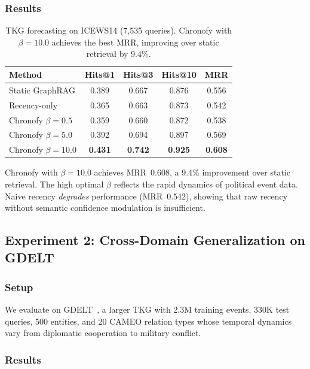 \documentclass[conference]{IEEEtran}
\begin{document}
\subsubsection{Results}

\begin{table}[t]
\centering
\caption{TKG forecasting on ICEWS14 (7,535 queries). Chronofy with $\beta=10.0$ achieves the best MRR, improving over static retrieval by 9.4\%.}
\label{tab:icews14}
\begin{tabular}{@{}lcccc@{}}
\toprule
\textbf{Method} & \textbf{Hits@1} & \textbf{Hits@3} & \textbf{Hits@10} & \textbf{MRR} \\
\midrule
Static GraphRAG & 0.389 & 0.667 & 0.876 & 0.556 \\
Recency-only & 0.365 & 0.663 & 0.873 & 0.542 \\
Chronofy $\beta{=}0.5$ & 0.359 & 0.660 & 0.872 & 0.538 \\
Chronofy $\beta{=}5.0$ & 0.392 & 0.694 & 0.897 & 0.569 \\
Chronofy $\beta{=}10.0$ & \textbf{0.431} & \textbf{0.742} & \textbf{0.925} & \textbf{0.608} \\
\bottomrule
\end{tabular}
\end{table}

Chronofy with $\beta=10.0$ achieves MRR~0.608, a 9.4\% improvement over static retrieval. The high optimal $\beta$ reflects the rapid dynamics of political event data. Naive recency \emph{degrades} performance (MRR~0.542), showing that raw recency without semantic confidence modulation is insufficient.

\subsection{Experiment 2: Cross-Domain Generalization on GDELT}

\subsubsection{Setup}
We evaluate on GDELT~\cite{garcia2018icews}, a larger TKG with 2.3M training events, 330K test queries, 500 entities, and 20 CAMEO relation types whose temporal dynamics vary from diplomatic cooperation to military conflict.

\subsubsection{Results}
\end{document}
